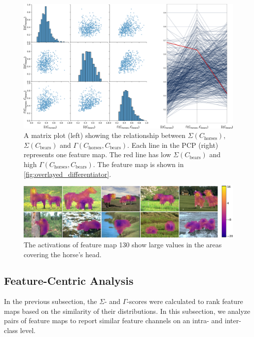 \begin{figure}
    \centering
    \includegraphics[width=\textwidth]{figures/pairplot.png}
    \caption{A matrix plot (left) showing the relationship between $\Sigma(C_{\text{horses}})$, $\Sigma(C_{\text{bears}})$ and $\Gamma(C_{\text{horses}}, C_{\text{bears}})$. Each line in the PCP (right) represents one feature map. The red line has low $\Sigma(C_{\text{bears}})$ and high $\Gamma(C_{\text{horses}}, C_{\text{bears}})$. The feature map is shown in \autoref{fig:overlayed_differentiator}.}
    \label{fig:pairplot}
\end{figure}

\begin{figure}
    \centering
    \includegraphics[width=\textwidth]{figures/overlayed_differentiator.pdf}
    \caption{The activations of feature map 130 show large values in the areas covering the horse's head.}
    \label{fig:overlayed_differentiator}
\end{figure}

\subsection{Feature-Centric Analysis}

In the previous subsection, the $\Sigma$- and $\Gamma$-scores were calculated to rank feature maps based on the similarity of their distributions. In this subsection, we analyze pairs of feature maps to report similar feature channels on an intra- and inter-class level.

